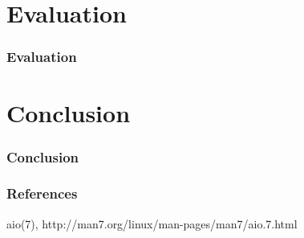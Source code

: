 \documentclass{beamer}
\begin{document}
\section{Evaluation}
\begin{frame}
    \frametitle{Evaluation}
\end{frame}

\section{Conclusion}
\begin{frame}
    \frametitle{Conclusion}
\end{frame}

\begin{frame}
    \frametitle{References}
    \footnotesize{
        \begin{thebibliography}{99}
                aio(7), http://man7.org/linux/man-pages/man7/aio.7.html
        \end{thebibliography}
        }
\end{frame}
\end{document}
